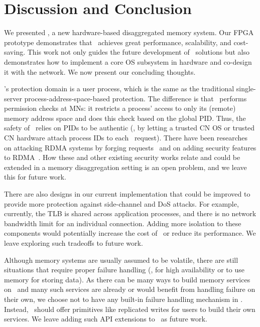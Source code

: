 \section{Discussion and Conclusion}
\label{sec:clio:discussion}

We presented \sys, a new hardware-based disaggregated memory system.
Our FPGA prototype demonstrates that \sys\ achieves great performance, scalability, and cost-saving.
This work not only guides the future development of \md\ solutions
but also demonstrates how to implement a core OS subsystem in hardware and co-design it with the network.
We now present our concluding thoughts.

\sys’s protection domain is a user process, which is the same as the traditional single-server process-address-space-based protection. The difference is that \sys\ performs permission checks at MNs: it restricts a process’ access to only its (remote) memory address space and does this check based on the global PID. Thus, the safety of \sys\ relies on PIDs to be authentic (\eg, by letting a trusted CN OS or trusted CN hardware attach process IDs to each \sys\ request). There have been researches on attacking RDMA systems by forging requests~\cite{ReDMArk-security21} and on adding security features to RDMA~\cite{1RMA,sRDMA-ATC20}. How these and other existing security works relate and could be extended in a memory disaggregation setting is an open problem, and we leave this for future work.

There are also designs in our current implementation that could be improved to provide more protection against side-channel and DoS attacks.
For example, currently, the TLB is shared across application processes,
and there is no network bandwidth limit for an individual connection.
Adding more isolation to these components would potentially increase the cost of \sysboard\ or reduce its performance.
We leave exploring such tradeoffs to future work.

Although memory systems are usually assumed to be volatile, %
there are still situations that require proper failure handling (\eg, for high availability or to use memory for storing data).
As there can be many ways to build memory services on \sys\ 
and many such services are already or would benefit from handling failure on their own,
we choose not to have any built-in failure handling mechanism in \sys.
Instead, \sys\ should offer primitives like replicated writes for users to build their own services.
We leave adding such API extensions to \sys\ as future work.

